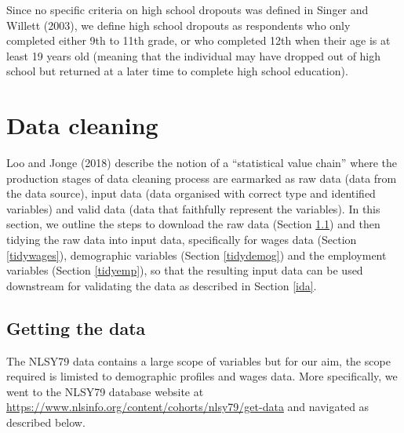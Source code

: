 \documentclass{article}
\begin{document}
Since no specific criteria on high school dropouts was defined
in Singer and Willett (2003), we define high school dropouts as respondents who only completed either 9th to 11th grade, or who completed 12th when their age is at least 19 years old (meaning that the individual may have dropped out of high school but returned at a later time to complete high school education).

\hypertarget{cleaning}{%
\section{Data cleaning}\label{cleaning}}

Loo and Jonge (2018) describe the notion of a ``statistical value chain'' where the production stages of data cleaning process are earmarked as raw data (data from the data source), input data (data organised with correct type and identified variables) and valid data (data that faithfully represent the variables). In this section, we outline the steps to download the raw data (Section \ref{getdata}) and then tidying the raw data into input data, specifically for wages data (Section \ref{tidywages}), demographic variables (Section \ref{tidydemog}) and the employment variables (Section \ref{tidyemp}), so that the resulting input data can be used downstream for validating the data as described in Section \ref{ida}.

\hypertarget{getdata}{%
\subsection{Getting the data}\label{getdata}}

The NLSY79 data contains a large scope of variables but for our aim, the scope required is limisted to demographic profiles and wages data. More specifically, we went to the NLSY79 database website at \url{https://www.nlsinfo.org/content/cohorts/nlsy79/get-data} and navigated as described below.
\end{document}
